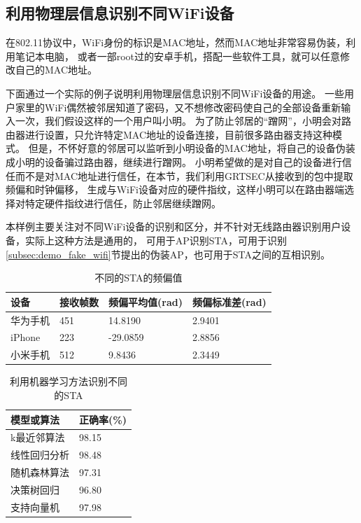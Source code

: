     \subsection{利用物理层信息识别不同WiFi设备}\label{subsec:demo_phy_auth}
  	在802.11协议中，WiFi身份的标识是MAC地址，然而MAC地址非常容易伪装，利用笔记本电脑，
  	或者一部root过的安卓手机，搭配一些软件工具，就可以任意修改自己的MAC地址\cite{NetworkSecurity11hacking}。

		下面通过一个实际的例子说明利用物理层信息识别不同WiFi设备的用途。
    一些用户家里的WiFi偶然被邻居知道了密码，又不想修改密码使自己的全部设备重新输入一次，我们假设这样的一个用户叫小明。
		为了防止邻居的“蹭网”，小明会对路由器进行设置，只允许特定MAC地址的设备连接，目前很多路由器支持这种模式。
		但是，不怀好意的邻居可以监听到小明设备的MAC地址，将自己的设备伪装成小明的设备骗过路由器，继续进行蹭网。
		小明希望做的是对自己的设备进行信任而不是对MAC地址进行信任，在本节，我们利用GRTSEC从接收到的包中提取频偏和时钟偏移，
		生成与WiFi设备对应的硬件指纹，这样小明可以在路由器端选择对特定硬件指纹进行信任，防止邻居继续蹭网。

		本样例主要关注对不同WiFi设备的识别和区分，并不针对无线路由器识别用户设备，实际上这种方法是通用的，
		可用于AP识别STA，可用于识别\ref{subsec:demo_fake_wifi}节提出的伪装AP，也可用于STA之间的互相识别。

      \begin{table}[!hbp]
      \centering
      \caption{不同的STA的频偏值}
      \label{tab:envaluate_freq_offset}
        \begin{tabular}{|l|l|l|l|} \hline
        设备 & 接收帧数 & 频偏平均值(rad) & 频偏标准差(rad) \\ \hline
        华为手机 & 451 & 14.8190 & 2.9401 \\ \hline
        iPhone & 223 & -29.0859 & 2.8856 \\ \hline
        小米手机 & 512 & 9.8436 & 2.3449 \\ \hline
        \end{tabular}
      \end{table}

      \begin{table}[!hbp]
      \centering
      \caption{利用机器学习方法识别不同的STA}
      \label{tab:envaluate_identify_sta}
        \begin{tabular}{|l|l|} \hline
        模型或算法 & 正确率(\%) \\ \hline
        k最近邻算法 & 98.15 \\ \hline
        线性回归分析 & 98.48 \\ \hline
        随机森林算法 & 97.31 \\ \hline
        决策树回归 & 96.80 \\ \hline
        支持向量机 & 97.98 \\ \hline
        \end{tabular}
      \end{table}

